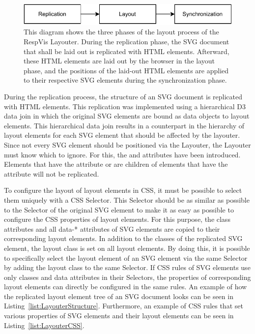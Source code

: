 \begin{figure}[tp]
\centering
\includegraphics[keepaspectratio,width=\linewidth,height=\fullh]{diagrams/respvis-layout-process.pdf}
\caption[Layout Process of the Layouter]{
  This diagram shows the three phases of the layout process of the RespVis Layouter. 
  During the replication phase, the SVG document that shall be laid out is replicated with HTML  elements. 
  Afterward, these HTML elements are laid out by the browser in the layout phase, and the positions of the laid-out HTML elements are applied to their respective SVG elements during the synchronization phase.
}
\label{fig:LayoutProcess}
\end{figure}


During the replication process, the structure of an SVG document is replicated with HTML  elements. 
This replication was implemented using a hierarchical D3 data join in which the original SVG elements are bound as data objects to layout elements.
This hierarchical data join results in a counterpart in the hierarchy of layout elements for each SVG element that should be affected by the layouter.
Since not every SVG element should be positioned via the Layouter, the Layouter must know which to ignore.
For this, the  and  attributes have been introduced.
Elements that have the  attribute or are children of elements that have the  attribute will not be replicated.

To configure the layout of layout elements in CSS, it must be possible to select them uniquely with a CSS Selector.
This Selector should be as similar as possible to the Selector of the original SVG element to make it as easy as possible to configure the CSS properties of layout elements.
For this purpose, the class attributes and all data-* attributes of SVG elements are copied to their corresponding layout elements.
In addition to the classes of the replicated SVG element, the layout class is set on all layout elements.
By doing this, it is possible to specifically select the layout element of an SVG element via the same Selector by adding the layout class to the same Selector. 
If CSS rules of SVG elements use only classes and data attributes in their Selectors, the properties of corresponding layout elements can directly be configured in the same rules.
An example of how the replicated layout element tree of an SVG document looks can be seen in Listing~\ref{list:LayouterStructure}.
Furthermore, an example of CSS rules that set various properties of SVG elements and their layout elements can be seen in Listing~\ref{list:LayouterCSS}.  

